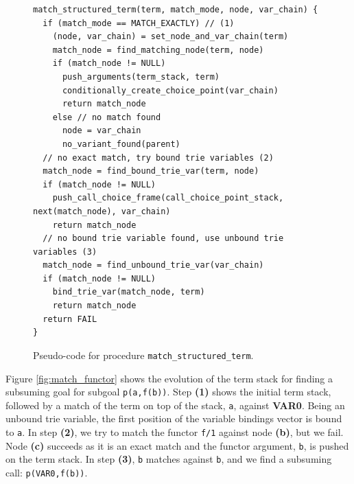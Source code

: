 \begin{figure}[ht]
\begin{Verbatim}
match_structured_term(term, match_mode, node, var_chain) {
  if (match_mode == MATCH_EXACTLY) // (1)
    (node, var_chain) = set_node_and_var_chain(term)
    match_node = find_matching_node(term, node)
    if (match_node != NULL)
      push_arguments(term_stack, term)
      conditionally_create_choice_point(var_chain)
      return match_node
    else // no match found
      node = var_chain
      no_variant_found(parent)
  // no exact match, try bound trie variables (2)
  match_node = find_bound_trie_var(term, node)
  if (match_node != NULL)
    push_call_choice_frame(call_choice_point_stack, next(match_node), var_chain)
    return match_node
  // no bound trie variable found, use unbound trie variables (3)
  match_node = find_unbound_trie_var(var_chain)
  if (match_node != NULL)
    bind_trie_var(match_node, term)
    return match_node
  return FAIL
}
\end{Verbatim}
\caption{Pseudo-code for procedure \texttt{match\_structured\_term}.}
\label{fig:match_structured_term}
\end{figure}

Figure \ref{fig:match_functor} shows the evolution of the term stack for finding
a subsuming goal for subgoal \texttt{p(a,f(b))}. Step \textbf{(1)} shows the initial 
term stack, followed by a match of the term on top of the stack, \texttt{a}, against \textbf{VAR0}.
Being an unbound trie variable, the first position of the variable bindings vector is
bound to \texttt{a}.
In step \textbf{(2)}, we try to match the functor \texttt{f/1} against node \textbf{(b)}, but we fail.
Node \textbf{(c)} succeeds as it is an exact match and the functor argument, \texttt{b}, is pushed on
the term stack. In step \textbf{(3)}, \texttt{b} matches against \texttt{b}, and we find a subsuming call:
\texttt{p(VAR0,f(b))}.

